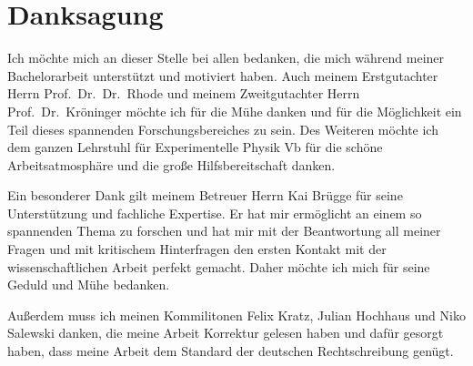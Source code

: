 \chapter*{Danksagung}
Ich möchte mich an dieser Stelle bei allen bedanken, die mich während meiner Bachelorarbeit unterstützt und motiviert haben.
Auch meinem Erstgutachter Herrn Prof.~Dr.~Dr.~Rhode und meinem Zweitgutachter Herrn Prof.~Dr.~Kröninger möchte ich für die Mühe danken
und für die Möglichkeit ein Teil dieses spannenden Forschungsbereiches zu sein. Des Weiteren möchte ich dem ganzen Lehrstuhl für
Experimentelle Physik Vb für die schöne Arbeitsatmosphäre und die große Hilfsbereitschaft danken.

Ein besonderer Dank gilt meinem Betreuer Herrn Kai Brügge für seine Unterstützung und fachliche Expertise. Er hat mir ermöglicht
an einem so spannenden Thema zu forschen und hat mir mit der Beantwortung all meiner Fragen und mit kritischem Hinterfragen den
ersten Kontakt mit der wissenschaftlichen Arbeit perfekt gemacht. Daher möchte ich mich für seine Geduld und Mühe bedanken.

Außerdem muss ich meinen Kommilitonen Felix Kratz, Julian Hochhaus und Niko Salewski danken, die meine Arbeit Korrektur gelesen haben und dafür gesorgt
haben, dass meine Arbeit dem Standard der deutschen Rechtschreibung genügt.
